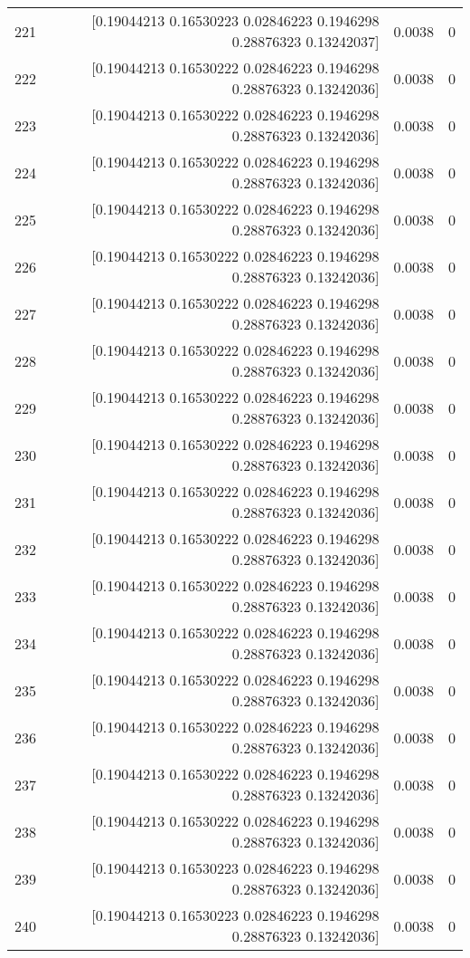 \begin{longtable}{lrrr}
221 & [0.19044213 0.16530223 0.02846223 0.1946298  0.28876323 0.13242037] & 0.0038 & 0 \\
222 & [0.19044213 0.16530222 0.02846223 0.1946298  0.28876323 0.13242036] & 0.0038 & 0 \\
223 & [0.19044213 0.16530222 0.02846223 0.1946298  0.28876323 0.13242036] & 0.0038 & 0 \\
224 & [0.19044213 0.16530222 0.02846223 0.1946298  0.28876323 0.13242036] & 0.0038 & 0 \\
225 & [0.19044213 0.16530222 0.02846223 0.1946298  0.28876323 0.13242036] & 0.0038 & 0 \\
226 & [0.19044213 0.16530222 0.02846223 0.1946298  0.28876323 0.13242036] & 0.0038 & 0 \\
227 & [0.19044213 0.16530222 0.02846223 0.1946298  0.28876323 0.13242036] & 0.0038 & 0 \\
228 & [0.19044213 0.16530222 0.02846223 0.1946298  0.28876323 0.13242036] & 0.0038 & 0 \\
229 & [0.19044213 0.16530222 0.02846223 0.1946298  0.28876323 0.13242036] & 0.0038 & 0 \\
230 & [0.19044213 0.16530222 0.02846223 0.1946298  0.28876323 0.13242036] & 0.0038 & 0 \\
231 & [0.19044213 0.16530222 0.02846223 0.1946298  0.28876323 0.13242036] & 0.0038 & 0 \\
232 & [0.19044213 0.16530222 0.02846223 0.1946298  0.28876323 0.13242036] & 0.0038 & 0 \\
233 & [0.19044213 0.16530222 0.02846223 0.1946298  0.28876323 0.13242036] & 0.0038 & 0 \\
234 & [0.19044213 0.16530222 0.02846223 0.1946298  0.28876323 0.13242036] & 0.0038 & 0 \\
235 & [0.19044213 0.16530222 0.02846223 0.1946298  0.28876323 0.13242036] & 0.0038 & 0 \\
236 & [0.19044213 0.16530222 0.02846223 0.1946298  0.28876323 0.13242036] & 0.0038 & 0 \\
237 & [0.19044213 0.16530222 0.02846223 0.1946298  0.28876323 0.13242036] & 0.0038 & 0 \\
238 & [0.19044213 0.16530222 0.02846223 0.1946298  0.28876323 0.13242036] & 0.0038 & 0 \\
239 & [0.19044213 0.16530223 0.02846223 0.1946298  0.28876323 0.13242036] & 0.0038 & 0 \\
240 & [0.19044213 0.16530223 0.02846223 0.1946298  0.28876323 0.13242036] & 0.0038 & 0 \\

\end{longtable}
